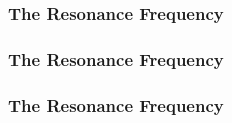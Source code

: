 \documentclass[fleqn]{beamer} %
\newcommand{\sectionIVsubsectionIIItitle}{The Resonance Frequency}
\begin{document}
			\begin{frame}
				\frametitle{\sectionIVsubsectionIIItitle}
				\bigskip

			

		 		\btVFill 
			\end{frame}
			
			\begin{frame}
				\frametitle{\sectionIVsubsectionIIItitle}
				\bigskip
				
				
					
				\btVFill 
			\end{frame}

			\begin{frame}
				\frametitle{\sectionIVsubsectionIIItitle}
				\bigskip
			
				
				\btVFill 
			\end{frame}
\end{document}
